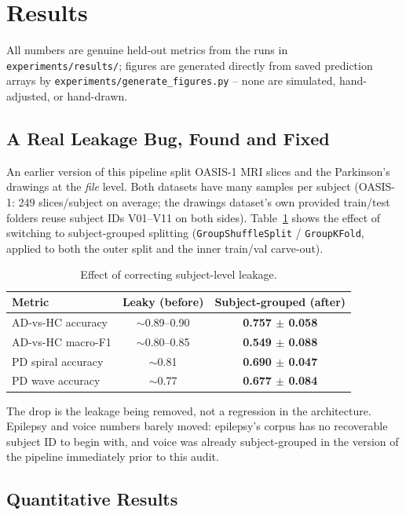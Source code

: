 \documentclass[conference]{IEEEtran}
\begin{document}
\section{Results}
\label{sec:results}

All numbers are genuine held-out metrics from the runs in
\texttt{experiments/results/}; figures are generated directly from saved
prediction arrays by \texttt{experiments/generate\_figures.py} -- none
are simulated, hand-adjusted, or hand-drawn.

\subsection{A Real Leakage Bug, Found and Fixed}
An earlier version of this pipeline split OASIS-1 MRI slices and the
Parkinson's drawings at the \emph{file} level. Both datasets have many
samples per subject (OASIS-1: 249 slices/subject on average; the
drawings dataset's own provided train/test folders reuse subject IDs
V01--V11 on both sides). Table~\ref{tab:leakage} shows the effect of
switching to subject-grouped splitting (\texttt{GroupShuffleSplit} /
\texttt{GroupKFold}, applied to both the outer split and the inner
train/val carve-out).

\begin{table}[!t]
\centering
\caption{Effect of correcting subject-level leakage.}
\label{tab:leakage}
\small
\begin{tabular}{lcc}
\toprule
\textbf{Metric} & \textbf{Leaky (before)} & \textbf{Subject-grouped (after)} \\
\midrule
AD-vs-HC accuracy & $\sim$0.89--0.90 & \textbf{0.757 $\pm$ 0.058} \\
AD-vs-HC macro-F1 & $\sim$0.80--0.85 & \textbf{0.549 $\pm$ 0.088} \\
PD spiral accuracy & $\sim$0.81 & \textbf{0.690 $\pm$ 0.047} \\
PD wave accuracy & $\sim$0.77 & \textbf{0.677 $\pm$ 0.084} \\
\bottomrule
\end{tabular}
\end{table}

The drop is the leakage being removed, not a regression in the
architecture. Epilepsy and voice numbers barely moved: epilepsy's corpus
has no recoverable subject ID to begin with, and voice was already
subject-grouped in the version of the pipeline immediately prior to this
audit.

\subsection{Quantitative Results}
\end{document}
